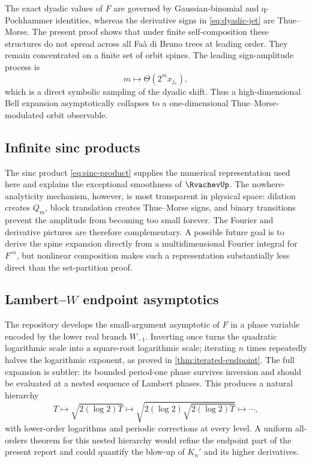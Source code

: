 \documentclass[11pt,oneside]{article}
\theoremstyle{definition}
\theoremstyle{remark}
\newcommand{\comp}{\mathbin{\circ}}
\newcommand{\ThetaF}{\Theta}
\begin{document}
The exact dyadic values of $F$ are governed by Gaussian-binomial and q-Pochhammer
identities, whereas the derivative signs in \eqref{eq:dyadic-jet} are Thue--Morse.
The present proof shows that under finite self-composition these structures do not
spread across all Fa\`a di Bruno trees at leading order.  They remain concentrated on
a finite set of orbit spines.  The leading sign-amplitude process is
\begin{equation}
 m\longmapsto
 \ThetaF(2^m x_{j_*}),
 \label{eq:leading-symbolic-process}
\end{equation}
which is a direct symbolic sampling of the dyadic shift.  Thus a high-dimensional
Bell expansion asymptotically collapses to a one-dimensional Thue--Morse-modulated
orbit observable.

\subsection{Infinite sinc products}

The sinc product \eqref{eq:sinc-product} supplies the numerical representation used
here and explains the exceptional smoothness of $\RvachevUp$.  The nowhere-analyticity
mechanism, however, is most transparent in physical space: dilation creates $Q_m$,
block translation creates Thue--Morse signs, and binary transitions prevent the
amplitude from becoming too small forever.  The Fourier and derivative pictures are
therefore complementary.  A possible future goal is to derive the spine expansion
directly from a multidimensional Fourier integral for $F^{\comp n}$, but nonlinear
composition makes such a representation substantially less direct than the
set-partition proof.

\subsection[Lambert-W endpoint asymptotics]{Lambert--$W$ endpoint asymptotics}

The repository develops the small-argument asymptotic of $F$ in a phase variable
encoded by the lower real branch $W_{-1}$.  Inverting once turns the quadratic
logarithmic scale into a square-root logarithmic scale; iterating $n$ times repeatedly
halves the logarithmic exponent, as proved in \cref{thm:iterated-endpoint}.
The full expansion is subtler: its bounded period-one phase survives inversion and
should be evaluated at a nested sequence of Lambert phases.  This produces a natural
hierarchy
\[
 T\mapsto\sqrt{2(\log2)T}\mapsto
 \sqrt{2(\log2)\sqrt{2(\log2)T}}\mapsto\cdots,
\]
with lower-order logarithms and periodic corrections at every level.  A uniform
all-orders theorem for this nested hierarchy would refine the endpoint part of the
present report and could quantify the blow-up of $K_n'$ and its higher derivatives.
\end{document}

